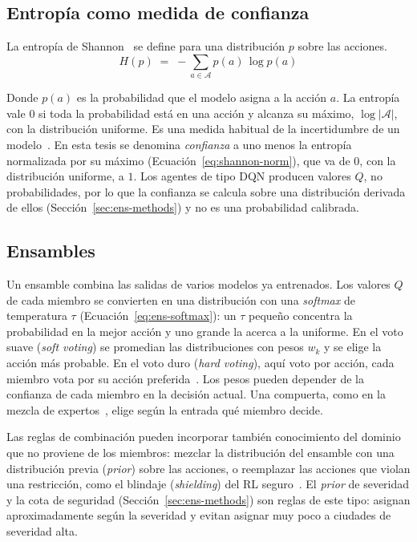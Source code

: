 \documentclass[../00_Main/Main.tex]{subfiles}
\begin{document}
\subsection{Entrop\'ia como medida de confianza}\label{sec:entropy-bg}

La entrop\'ia de Shannon~\citep{Shannon1948} se define para una
distribuci\'on $p$ sobre las acciones.
\begin{equation}
H(p) \;=\; -\sum_{a \in \mathcal{A}} p(a)\,\log p(a)
\label{eq:shannon}
\end{equation}

Donde $p(a)$ es la probabilidad que el modelo asigna a la acci\'on $a$. La
entrop\'ia vale $0$ si toda la probabilidad est\'a en una acci\'on y
alcanza su m\'aximo, $\log|\mathcal{A}|$, con la distribuci\'on uniforme.
Es una medida habitual de la incertidumbre de un
modelo~\citep{Lakshminarayanan2017}. En esta tesis se denomina
\emph{confianza} a uno menos la entrop\'ia normalizada por su m\'aximo
(Ecuaci\'on~\eqref{eq:shannon-norm}), que va de $0$, con la distribuci\'on
uniforme, a $1$. Los agentes de tipo DQN producen valores $Q$, no
probabilidades, por lo que la confianza se calcula sobre una
distribuci\'on derivada de ellos (Secci\'on~\ref{sec:ens-methods}) y no
es una probabilidad calibrada.

\subsection{Ensambles}\label{sec:ensembles-bg}

Un ensamble combina las salidas de varios modelos ya entrenados. Los
valores $Q$ de cada miembro se convierten en una distribuci\'on con una
\emph{softmax} de temperatura $\tau$ (Ecuaci\'on~\eqref{eq:ens-softmax}): un $\tau$ peque\~no concentra la
probabilidad en la mejor acci\'on y uno grande la acerca a la uniforme.
En el voto suave (\emph{soft voting}) se promedian las distribuciones con
pesos $w_k$ y se elige la acci\'on m\'as probable. En el voto duro
(\emph{hard voting}), aqu\'i voto por acci\'on, cada
miembro vota por su acci\'on preferida~\citep{Wiering2008}. Los pesos
pueden depender de la confianza de cada miembro en la decisi\'on actual.
Una compuerta, como en la mezcla de expertos~\citep{Jacobs1991}, elige
seg\'un la entrada qu\'e miembro decide.

Las reglas de combinaci\'on pueden incorporar tambi\'en conocimiento del
dominio que no proviene de los miembros: mezclar la distribuci\'on del
ensamble con una distribuci\'on previa (\emph{prior}) sobre las acciones,
o reemplazar las acciones que violan una restricci\'on, como el blindaje
(\emph{shielding}) del RL seguro~\citep{Alshiekh2018}. El \emph{prior} de
severidad y la cota de seguridad (Secci\'on~\ref{sec:ens-methods})
son reglas de este tipo: asignan
aproximadamente seg\'un la severidad y evitan asignar muy poco a
ciudades de severidad alta.
\end{document}
